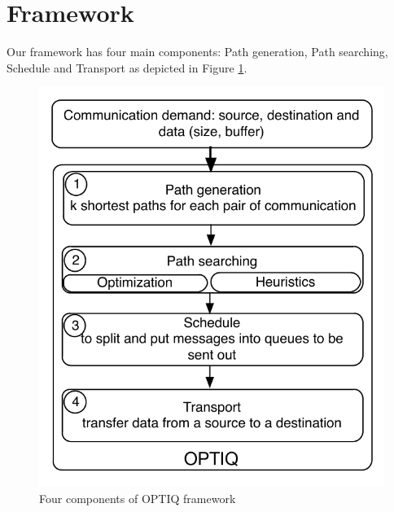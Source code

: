 \section{Framework}
\label{sec:framework}

Our framework has four main components: Path generation, Path searching, Schedule and Transport as depicted in Figure \ref{fig:framework}.

\begin{figure}[!htb]
\vspace{-0.1in}
\centering
\includegraphics[scale=0.7]{figures/framework.pdf}
\vspace{-0.1in}
\caption{Four components of OPTIQ framework}
\vspace{-0.1in}
\label{fig:framework}
\end{figure}


